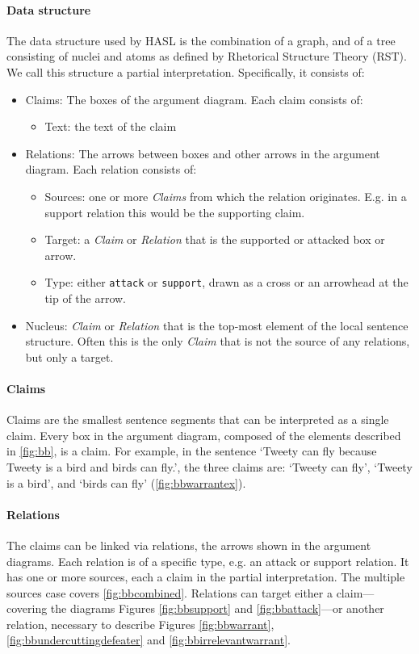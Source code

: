\documentclass{IOS-Book-Article}
\begin{document}
\paragraph{Data structure}

The data structure used by HASL is the combination of a graph, and of a tree consisting of nuclei and atoms as defined by Rhetorical Structure Theory (RST). We call this structure a partial interpretation. Specifically, it consists of:

\begin{itemize}
	\item Claims: The boxes of the argument diagram. Each claim consists of:
	\begin{itemize}
		\item Text: the text of the claim
	\end{itemize}
	\item Relations: The arrows between boxes and other arrows in the argument diagram. Each relation consists of:
	\begin{itemize}
		\item Sources: one or more \emph{Claims} from which the relation originates. E.g. in a support relation this would be the supporting claim.
		\item Target: a \emph{Claim} or \emph{Relation} that is the supported or attacked box or arrow.
		\item Type: either \texttt{attack} or \texttt{support}, drawn as a cross or an arrowhead at the tip of the arrow.
	\end{itemize}
	\item Nucleus: \emph{Claim} or \emph{Relation} that is the top-most element of the local sentence structure. Often this is the only \emph{Claim} that is not the source of any relations, but only a target.
\end{itemize}

\paragraph{Claims} Claims are the smallest sentence segments that can be interpreted as a single claim. Every box in the argument diagram, composed of the elements described in \autoref{fig:bb}, is a claim. For example, in the sentence `Tweety can fly because Tweety is a bird and birds can fly.', the three claims are: `Tweety can fly', `Tweety is a bird', and `birds can fly' (\autoref{fig:bbwarrantex}).

\paragraph{Relations} The claims can be linked via relations, the arrows shown in the argument diagrams. Each relation is of a specific type, e.g. an attack or support relation. It has one or more sources, each a claim in the partial interpretation. The multiple sources case covers \autoref{fig:bbcombined}. Relations can target either a claim---covering the diagrams Figures \ref{fig:bbsupport} and \ref{fig:bbattack}---or another relation, necessary to describe Figures \ref{fig:bbwarrant}, \ref{fig:bbundercuttingdefeater} and \ref{fig:bbirrelevantwarrant}.
\end{document}

